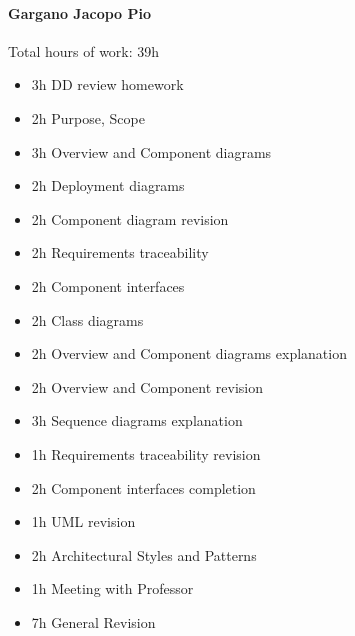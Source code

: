 \documentclass{report}
\begin{document}
		\paragraph{Gargano Jacopo Pio} Total hours of work: 39h
			\begin{itemize}
				\item 3h DD review homework
				\item 2h Purpose, Scope
				\item 3h Overview and Component diagrams
				\item 2h Deployment diagrams
				\item 2h Component diagram revision
				\item 2h Requirements traceability
				\item 2h Component interfaces
				\item 2h Class diagrams
				\item 2h Overview and Component diagrams explanation
				\item 2h Overview and Component revision
				\item 3h Sequence diagrams explanation
				\item 1h Requirements traceability revision
				\item 2h Component interfaces completion
				\item 1h UML revision
				\item 2h Architectural Styles and Patterns
				\item 1h Meeting with Professor
				\item 7h General Revision
			\end{itemize}
\end{document}
